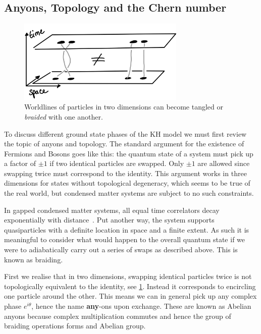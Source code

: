 \hypertarget{anyons-topology-and-the-chern-number}{%
\subsection{Anyons, Topology and the Chern number}\label{anyons-topology-and-the-chern-number}}

\hypertarget{fig:braiding}{%
\begin{figure}
\centering
\includegraphics[width=0.71\textwidth,height=\textheight]{figure_code/amk_chapter/braiding.png}
\caption[{Braiding in Two Dimensions}]{Worldlines of particles in two dimensions can become tangled or \emph{braided} with one another.}
\label{fig:braiding}
\end{figure}
}

To discuss different ground state phases of the KH model we must first review the topic of anyons and topology. The standard argument for the existence of Fermions and Bosons goes like this: the quantum state of a system must pick up a factor of \(\pm1\) if two identical particles are swapped. Only \(\pm1\) are allowed since swapping twice must correspond to the identity. This argument works in three dimensions for states without topological degeneracy, which seems to be true of the real world, but condensed matter systems are subject to no such constraints.

In gapped condensed matter systems, all equal time correlators decay exponentially with distance~\autocite{hastingsLiebSchultzMattisHigherDimensions2004}. Put another way, the system supports quasiparticles with a definite location in space and a finite extent. As such it is meaningful to consider what would happen to the overall quantum state if we were to adiabatically carry out a series of swaps as described above. This is known as braiding.

First we realise that in two dimensions, swapping identical particles twice is not topologically equivalent to the identity, see \cref{fig:braiding}. Instead it corresponds to encircling one particle around the other. This means we can in general pick up any complex phase \(e^{i\theta}\), hence the name \textbf{any}-ons upon exchange. These are known as Abelian anyons because complex multiplication commutes and hence the group of braiding operations forms and Abelian group.

